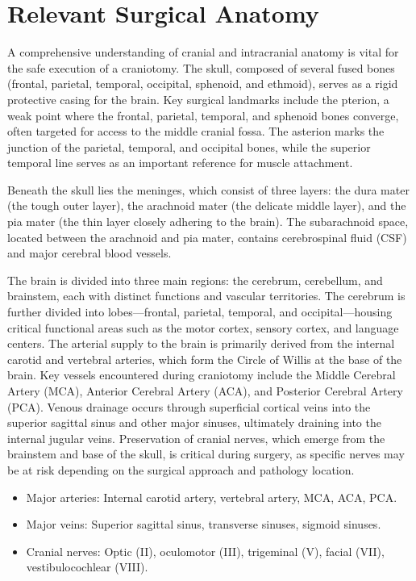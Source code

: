 \section*{Relevant Surgical Anatomy}
A comprehensive understanding of cranial and intracranial anatomy is vital for the safe execution of a craniotomy. The skull, composed of several fused bones (frontal, parietal, temporal, occipital, sphenoid, and ethmoid), serves as a rigid protective casing for the brain. Key surgical landmarks include the pterion, a weak point where the frontal, parietal, temporal, and sphenoid bones converge, often targeted for access to the middle cranial fossa. The asterion marks the junction of the parietal, temporal, and occipital bones, while the superior temporal line serves as an important reference for muscle attachment.

Beneath the skull lies the meninges, which consist of three layers: the dura mater (the tough outer layer), the arachnoid mater (the delicate middle layer), and the pia mater (the thin layer closely adhering to the brain). The subarachnoid space, located between the arachnoid and pia mater, contains cerebrospinal fluid (CSF) and major cerebral blood vessels.

The brain is divided into three main regions: the cerebrum, cerebellum, and brainstem, each with distinct functions and vascular territories. The cerebrum is further divided into lobes—frontal, parietal, temporal, and occipital—housing critical functional areas such as the motor cortex, sensory cortex, and language centers. The arterial supply to the brain is primarily derived from the internal carotid and vertebral arteries, which form the Circle of Willis at the base of the brain. Key vessels encountered during craniotomy include the Middle Cerebral Artery (MCA), Anterior Cerebral Artery (ACA), and Posterior Cerebral Artery (PCA). Venous drainage occurs through superficial cortical veins into the superior sagittal sinus and other major sinuses, ultimately draining into the internal jugular veins. Preservation of cranial nerves, which emerge from the brainstem and base of the skull, is critical during surgery, as specific nerves may be at risk depending on the surgical approach and pathology location.

\begin{itemize}
  \item Major arteries: Internal carotid artery, vertebral artery, MCA, ACA, PCA.
  \item Major veins: Superior sagittal sinus, transverse sinuses, sigmoid sinuses.
  \item Cranial nerves: Optic (II), oculomotor (III), trigeminal (V), facial (VII), vestibulocochlear (VIII).
\end{itemize}


